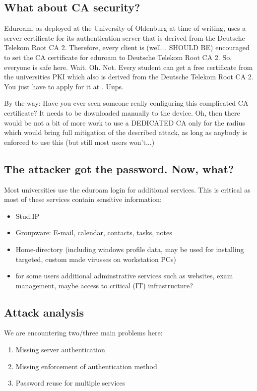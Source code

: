 \documentclass[12pt,a4paper]{scrartcl}
\begin{document}
\subsection{What about CA security?}
Eduroam, as deployed at the University of Oldenburg at time of writing, uses a server certificate for its authentication server that is derived from the Deutsche Telekom Root CA 2.
Therefore, every client is (well... SHOULD BE) encouraged to set the CA certificate for eduroam to Deutsche Telekom Root CA 2.
So, everyone is safe here.\newline
Wait.\newline
Oh.\newline
Not.\newline
Every student can get a free certificate from the universities PKI which also is derived from the Deutsche Telekom Root CA 2. You just have to apply for it at \cite{ol-pki}.\newline
Uups.

By the way: Have you ever seen someone really configuring this complicated CA certificate?
It needs to be downloaded manually to the device.
Oh, then there would be not a bit of more work to use a DEDICATED CA only for the radius which would bring full mitigation of the described attack, as long as anybody is enforced to use this (but still most users won't...)

\subsection{The attacker got the password. Now, what?}
Most universities use the eduroam login for additional services.
This is critical as most of these services contain sensitive information:
\begin{itemize}
  \item Stud.IP
  \item Groupware: E-mail, calendar, contacts, tasks, notes
  \item Home-directory (including windows profile data, may be used for installing targeted, custom made virusses on workstation PCs)
  \item for some users additional adminstrative services such as websites, exam management, maybe access to critical (IT) infrastructure?
\end{itemize}

\subsection{Attack analysis}
We are encountering two/three main problems here:
\begin{enumerate}
  \item Missing server authentication
  \item Missing enforcement of authentication method
  \item Password reuse for multiple services
\end{enumerate}
\end{document}
